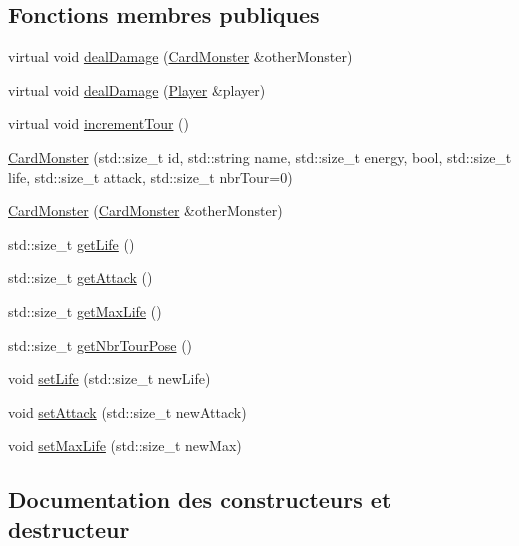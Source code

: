 \subsection*{Fonctions membres publiques}
\begin{DoxyCompactItemize}
\item 
virtual void \hyperlink{classCardMonster_aaf28396b394a9400d257eddfa09e4567}{deal\+Damage} (\hyperlink{classCardMonster}{Card\+Monster} \&other\+Monster)
\item 
virtual void \hyperlink{classCardMonster_aef45590287342f0a5d484c1228bae76d}{deal\+Damage} (\hyperlink{classPlayer}{Player} \&player)
\item 
virtual void \hyperlink{classCardMonster_a2d55cf30d111437486e2b1bacefcbf79}{increment\+Tour} ()
\item 
\hyperlink{classCardMonster_acb8d195232b735700c2068b001d5278d}{Card\+Monster} (std\+::size\+\_\+t id, std\+::string name, std\+::size\+\_\+t energy, bool, std\+::size\+\_\+t life, std\+::size\+\_\+t attack, std\+::size\+\_\+t nbr\+Tour=0)
\item 
\hyperlink{classCardMonster_a5f577cbecdf0d1c6a6ccbc848793ddef}{Card\+Monster} (\hyperlink{classCardMonster}{Card\+Monster} \&other\+Monster)
\item 
std\+::size\+\_\+t \hyperlink{classCardMonster_a01f20967b3b350e8430c30396c8cd0c9}{get\+Life} ()
\item 
std\+::size\+\_\+t \hyperlink{classCardMonster_a38fd3549de7e606f73e836ba98ed4f24}{get\+Attack} ()
\item 
std\+::size\+\_\+t \hyperlink{classCardMonster_a0e963cc2c613826e28891f00a9787e58}{get\+Max\+Life} ()
\item 
std\+::size\+\_\+t \hyperlink{classCardMonster_a8f3fd5d1e30a520aaa0c282bd84aa5d5}{get\+Nbr\+Tour\+Pose} ()
\item 
void \hyperlink{classCardMonster_aa70aa05b038da703524b82df5608734b}{set\+Life} (std\+::size\+\_\+t new\+Life)
\item 
void \hyperlink{classCardMonster_a358474586372d6b2b83301cceae34347}{set\+Attack} (std\+::size\+\_\+t new\+Attack)
\item 
void \hyperlink{classCardMonster_a9860956677866c7adbcda61c9951dd35}{set\+Max\+Life} (std\+::size\+\_\+t new\+Max)
\end{DoxyCompactItemize}


\subsection{Documentation des constructeurs et destructeur}
\hypertarget{classCardMonster_acb8d195232b735700c2068b001d5278d}{}
